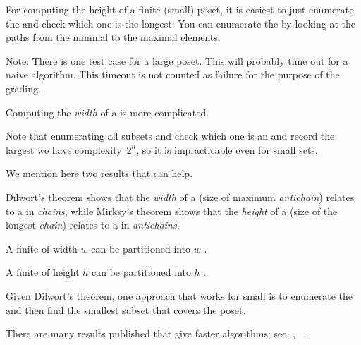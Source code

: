 

\begin{hint}
    For computing the height of a finite (small) poset, it is easiest to just enumerate the  and check which one is the longest.
    You can enumerate the  by looking at the paths from the minimal to the maximal elements.
\end{hint}

Note: There is one test case for a large poset.
This will probably time out for a naive algorithm.
This timeout is not counted as failure for the purpose of the grading.

\begin{hint}
    Computing the \emph{width} of a  is more complicated.

    Note that enumerating all subsets and check which one is an  and record the largest we have complexity~$2^n$, so it is impracticable even for small sets.

    We mention here two results that can help.

    Dilwort's theorem shows that the \emph{width} of a  (size of maximum \emph{antichain}) relates to a  in \emph{chains}, while Mirksy's theorem shows that the \emph{height} of a  (size of the longest \emph{chain}) relates to a  in \emph{antichains}.

    \begin{theorem}
        \label{thm:dilwort}
        A finite  of width $w$ can be partitioned into $w$ .
    \end{theorem}

    \begin{theorem}
        \label{thm:mirsky}
        A finite  of height $h$ can be partitioned into $h$ .
    \end{theorem}

    Given Dilwort's theorem, one approach that works for small  is to enumerate the  and then find the smallest subset that covers the poset.

    There are many results published that give faster algorithms; see, \eg, ~\cite{chen12decomposition}.

\end{hint}

